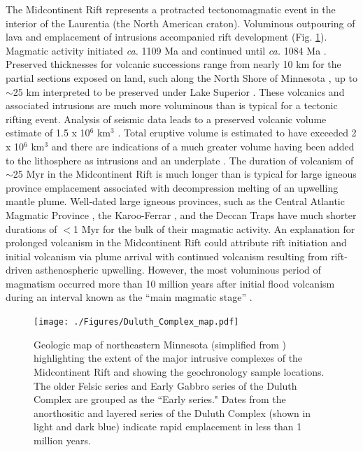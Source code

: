 \documentclass[11pt,letterpaper]{article}
\begin{document}
The Midcontinent Rift represents a protracted tectonomagmatic event in the interior of the Laurentia (the North American craton). Voluminous outpouring of lava and emplacement of intrusions accompanied rift development (Fig. \ref{fig:map}). Magmatic activity initiated \textit{ca.} 1109 Ma and continued until \textit{ca.} 1084 Ma \citep{Swanson-Hysell2019a}. Preserved thicknesses for volcanic successions range from nearly 10 km for the partial sections exposed on land, such along the North Shore of Minnesota \citep{Green2011a}, up to $\sim$25 km interpreted to be preserved under Lake Superior \citep{Cannon1992b}. These volcanics and associated intrusions are much more voluminous than is typical for a tectonic rifting event. Analysis of seismic data leads to a preserved volcanic volume estimate of 1.5 x 10$^6$ km$^3$ \citep{Cannon1992b}. Total eruptive volume is estimated to have exceeded 2 x 10$^6$ km$^3$ and there are indications of a much greater volume having been added to the lithosphere as intrusions and an underplate \citep{Cannon1992b}. The duration of volcanism of $\sim$25 Myr in the Midcontinent Rift is much longer than is typical for large igneous province emplacement associated with decompression melting of an upwelling mantle plume. Well-dated large igneous provinces, such as the Central Atlantic Magmatic Province \citep{Blackburn2013a}, the Karoo-Ferrar \citep{Burgess2015a}, and the Deccan Traps \citep{Schoene2019a, Sprain2019a} have much shorter durations of $<$1 Myr for the bulk of their magmatic activity. An explanation for prolonged volcanism in the Midcontinent Rift could attribute rift initiation and initial volcanism via plume arrival with continued volcanism resulting from rift-driven asthenospheric upwelling. However, the most voluminous period of magmatism occurred more than 10 million years after initial flood volcanism during an interval known as the ``main magmatic stage'' \citep{Vervoort2007a}. 

\begin{figure}
\centering
\noindent\texttt{[image: ./Figures/Duluth\_Complex\_map.pdf]}
\caption{\small{Geologic map of northeastern Minnesota (simplified from \citealp{Jirsa2011a}) highlighting the extent of the major intrusive complexes of the Midcontinent Rift and showing the geochronology sample locations. The older Felsic series and Early Gabbro series of the Duluth Complex are grouped as the ``Early series." Dates from the anorthositic and layered series of the Duluth Complex (shown in light and dark blue) indicate rapid emplacement in less than 1 million years.}}
\label{fig:map}
\end{figure} 
\end{document}
